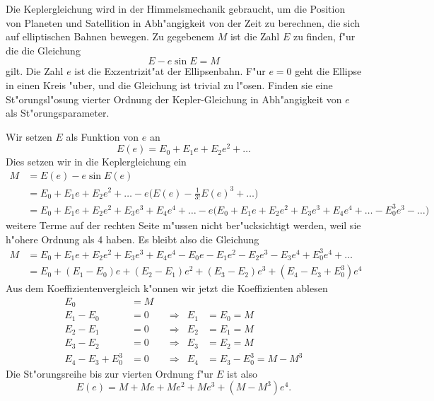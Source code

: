 Die Keplergleichung wird in der Himmelsmechanik gebraucht, um die 
Position von Planeten und Satellition in Abh"angigkeit von der Zeit
zu berechnen, die sich auf elliptischen Bahnen bewegen.
Zu gegebenem $M$ ist die Zahl $E$ zu finden, f"ur die die Gleichung
\[
E-e\sin E=M
\]
gilt.
Die Zahl $e$ ist die Exzentrizit"at der Ellipsenbahn. F"ur $e=0$
geht die Ellipse in einen Kreis "uber, und die Gleichung ist trivial
zu l"osen. Finden sie eine St"orungsl"osung vierter Ordnung
der Kepler-Gleichung in Abh"angigkeit von $e$ als St"orungsparameter.

\begin{loesung}
Wir setzen $E$ als Funktion von $e$ an
\[
E(e)
=
E_0+E_1e+E_2e^2+\dots
\]
Dies setzen wir in die Keplergleichung ein
\begin{align*}
M
&=
E(e)-e\sin E(e)
\\
&=
E_0+E_1e+E_2e^2+\dots
-e\biggl(
E(e)-\frac1{3!}E(e)^3+\dots
\biggr)
\\
&=
E_0+E_1e+E_2e^2+E_3e^3+E_4e^4+\dots
-e\biggl(
E_0+E_1e+E_2e^2+E_3e^3+E_4e^4+\dots
-E_0^3e^3-\dots
\biggr)
\end{align*}
weitere Terme auf der rechten Seite m"ussen nicht ber"ucksichtigt
werden, weil sie h"ohere Ordnung als 4 haben.
Es bleibt also die Gleichung
\begin{align*}
M
&=
E_0+E_1e+E_2e^2+E_3e^3+E_4e^4
-E_0e-E_1e^2-E_2e^3-E_3e^4
+E_0^3e^4+\dots
\\
&=
E_0
+(E_1-E_0)e
+(E_2-E_1)e^2
+(E_3-E_2)e^3
+(E_4-E_3+E_0^3)e^4
\end{align*}
Aus dem Koeffizientenvergleich k"onnen wir jetzt die Koeffizienten ablesen
\begin{equation}
\begin{aligned}
E_0&=M
\\
E_1-E_0&=0&&\Rightarrow&E_1&=E_0=M\\
E_2-E_1&=0&&\Rightarrow&E_2&=E_1=M\\
E_3-E_2&=0&&\Rightarrow&E_3&=E_2=M\\
E_4-E_3+E_0^3&=0&&\Rightarrow&E_4&=E_3-E_0^3=M-M^3
\end{aligned}
\end{equation}
Die St"orungsreihe bis zur vierten Ordnung f"ur $E$ ist also
\[
E(e)=M+Me+Me^2+Me^3+(M-M^3)e^4.
\]
\end{loesung}

